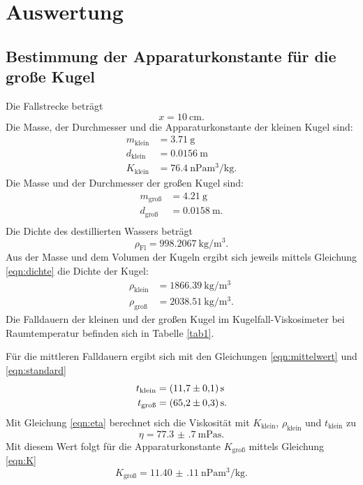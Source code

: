 \section{Auswertung}
\label{sec:Auswertung}

\subsection{Bestimmung der Apparaturkonstante für die große Kugel}
Die Fallstrecke beträgt 
\begin{equation*}
    x = \SI{10}{\centi\meter}.
\end{equation*}
Die Masse, der Durchmesser und die Apparaturkonstante der kleinen Kugel sind:
\begin{align*}
    m_\text{klein} &= \SI{3.71}{\gram} \\
    d_\text{klein} &= \SI{0.0156}{\meter} \\
    K_\text{klein} &= \SI{76.4}{\nano\pascal\cubic\meter\per\kilo\gram}.
\end{align*}
Die Masse und der Durchmesser der großen Kugel sind:
\begin{align*}
    m_\text{groß} &= \SI{4.21}{\gram} \\
    d_\text{groß} &= \SI{0.0158}{\meter}. \\
\end{align*}
Die Dichte des destillierten Wassers beträgt
\begin{equation*}
    \rho_\text{Fl} = \SI{998.2067}{\kilo\gram\per\cubic\meter}.
\end{equation*}
Aus der Masse und dem Volumen der Kugeln ergibt sich jeweils mittels Gleichung \eqref{eqn:dichte}
die Dichte der Kugel:
\begin{align*}
    \rho_\text{klein} &= \SI{1866.39}{\kilo\gram\per\cubic\meter} \\
    \rho_\text{groß} &= \SI{2038.51}{\kilo\gram\per\cubic\meter}.
\end{align*}
Die Falldauern der kleinen und der großen Kugel im Kugelfall-Viskosimeter
bei Raumtemperatur befinden sich in Tabelle \ref{tab1}.

\noindent Für die mittleren Falldauern ergibt sich mit den Gleichungen \eqref{eqn:mittelwert} 
und \eqref{eqn:standard}
\begin{align*}
    t_\text{klein} &= \SI{11.7 \pm 0.1}{\second} \\
    t_\text{groß} &= \SI{65.2 \pm 0.3}{\second}.
\end{align*}
Mit Gleichung \eqref{eqn:eta} berechnet sich die Viskosität mit $K_\text{klein}$,
$\rho_\text{klein}$ und $t_\text{klein}$ zu
\begin{equation*}
    \eta = \SI{77.3(7)}{\milli\pascal\second}.%
\end{equation*}
Mit diesem Wert folgt für die Apparaturkonstante $K_\text{groß}$
mittels Gleichung \eqref{eqn:K}
\begin{equation*}
    K_\text{groß} = \SI{11.40(11)}{\nano\pascal\cubic\meter\per\kilo\gram}.
\end{equation*}

